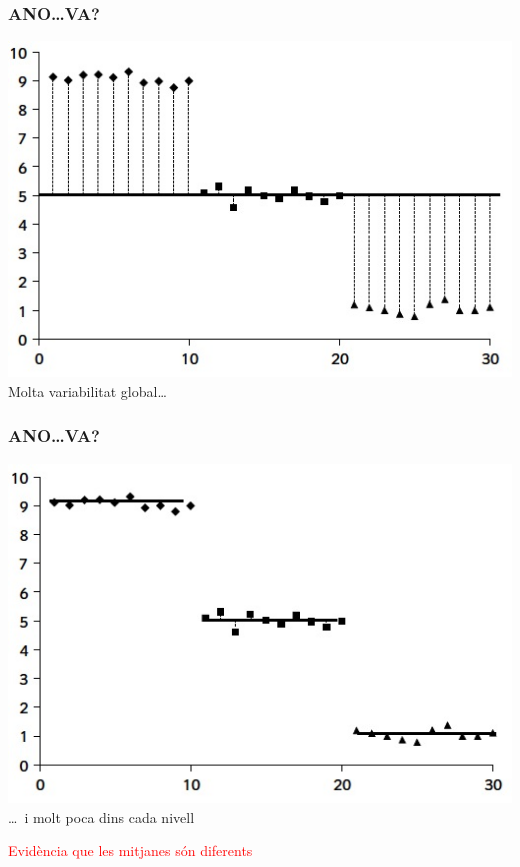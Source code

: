 \documentclass[12pt,t]{beamer}
\newcommand{\red}[1]{\textcolor{red}{#1}}
\theoremstyle{plain}
\theoremstyle{definition}
\begin{document}
\begin{frame}
\frametitle{ANO\ldots VA?}

\begin{center}
\includegraphics[width=0.8\linewidth]{FD1-1}\\
Molta variabilitat global\ldots 
\end{center}
\end{frame}

\begin{frame}
\frametitle{ANO\ldots VA?}

\begin{center}
\includegraphics[width=0.8\linewidth]{FD1-2}\\
\ldots\ i molt poca dins cada nivell \\ \pause
\medskip

\red{Evidència que les mitjanes són  diferents}

\end{center}
\end{frame}
\end{document}
